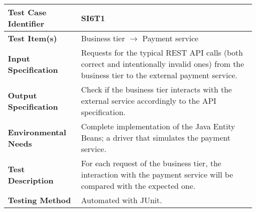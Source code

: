 \begin{tabular}{l p{}}
    \hline
    \textbf{Test Case Identifier} & SI6T1\\
    \hline
    \textbf{Test Item(s)} & Business tier $\rightarrow$ Payment service\\
    \hline
    \textbf{Input Specification} & Requests for the typical REST API calls (both correct and intentionally invalid ones) from the business tier to the external payment service.\\
    \hline
    \textbf{Output Specification} & Check if the business tier interacts with the external service accordingly to the API specification.\\
    \hline
    \textbf{Environmental Needs} & Complete implementation of the Java Entity Beans; a driver that simulates the payment service.\\
    \hline
    \textbf{Test Description} & For each request of the business tier, the interaction with the payment service will be compared with the expected one.\\
    \hline
    \textbf{Testing Method} & Automated with JUnit.\\
    \hline
\end{tabular}